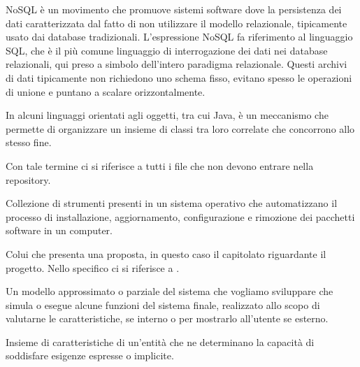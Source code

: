 
NoSQL è un movimento che promuove sistemi software dove la persistenza dei dati caratterizzata dal fatto di non utilizzare il modello relazionale, tipicamente usato dai database tradizionali. L'espressione NoSQL fa riferimento al linguaggio SQL, che è il più comune linguaggio di interrogazione dei dati nei database relazionali, qui preso a simbolo dell'intero paradigma relazionale.
Questi archivi di dati tipicamente non richiedono uno schema fisso, evitano spesso le operazioni di unione e puntano a scalare orizzontalmente. \\



In alcuni linguaggi orientati agli oggetti, tra cui Java, è un meccanismo che permette di organizzare un insieme di classi 
tra loro correlate che concorrono allo stesso fine. \\





Con tale termine ci si riferisce a tutti i file che non devono entrare nella repository. \\


Collezione di strumenti presenti in un sistema operativo che automatizzano il processo di installazione, aggiornamento, configurazione e rimozione dei pacchetti software in un computer. \\


Colui che presenta una proposta, in questo caso il capitolato riguardante il progetto.
Nello specifico ci si riferisce a \Proponente . \\  


Un modello approssimato o parziale del sistema che vogliamo sviluppare che simula o esegue alcune funzioni del sistema finale, realizzato allo scopo di valutarne le caratteristiche, se interno o per mostrarlo all'utente se esterno. \\



Insieme di caratteristiche di un'entità che ne determinano la capacità di soddisfare esigenze espresse o implicite. \\

